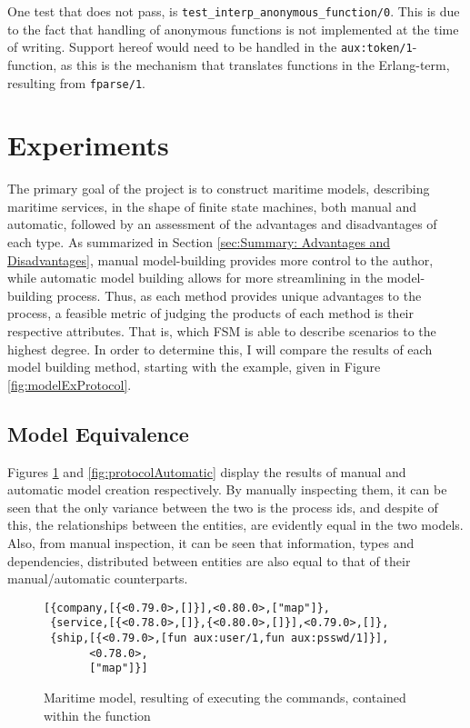 One test that does not pass, is \lstinline{test_interp_anonymous_function/0}. This is due to the fact that handling of anonymous functions is not implemented at the time of writing. Support hereof would need to be handled in the \linebreak \lstinline{aux:token/1}-function, as this is the mechanism that translates functions in the Erlang-term, resulting from \lstinline{fparse/1}.

\section{Experiments}

The primary goal of the project is to construct maritime models, describing maritime services, in the shape of finite state machines, both manual and automatic, followed by an assessment of the advantages and disadvantages of each type. As summarized in Section \ref{sec:Summary: Advantages and Disadvantages}, manual model-building provides more control to the author, while automatic model building allows for more streamlining in the model-building process. Thus, as each method provides unique advantages to the process, a feasible metric of judging the products of each method is their respective attributes. That is, which FSM is able to describe scenarios to the highest degree. In order to determine this, I will compare the results of each model building method, starting with the example, given in Figure \ref{fig:modelExProtocol}.

\subsection{Model Equivalence}

Figures \ref{fig:protocolManual} and \ref{fig:protocolAutomatic} display the results of manual and automatic model creation respectively. By manually inspecting them, it can be seen that the only variance between the two is the process ids, and despite of this, the relationships between the entities, are evidently equal in the two models. Also, from manual inspection, it can be seen that information, types and dependencies, distributed between entities are also equal to that of their manual/automatic counterparts.

\begin{figure}[h]
  \begin{lstlisting}[keywordstyle={}]
[{company,[{<0.79.0>,[]}],<0.80.0>,["map"]},
 {service,[{<0.78.0>,[]},{<0.80.0>,[]}],<0.79.0>,[]},
 {ship,[{<0.79.0>,[fun aux:user/1,fun aux:psswd/1]}],
       <0.78.0>,
       ["map"]}]
  \end{lstlisting}
  \caption{Maritime model, resulting of executing the commands, contained within the function }
  \label{fig:protocolManual}
\end{figure}

